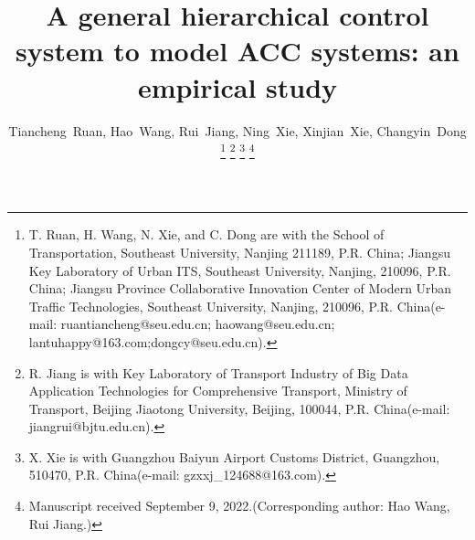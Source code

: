 \documentclass[journal]{IEEEtran}
\begin{document}



\title {A general hierarchical control system to model ACC systems: an empirical study}




%
\author{Tiancheng~Ruan,
  Hao~Wang,
  Rui~Jiang,
  Ning~Xie,
  Xinjian~Xie,
  Changyin~Dong
  \thanks{T. Ruan,  H. Wang, N. Xie, and C. Dong are with the
    School of Transportation, Southeast University, Nanjing 211189, P.R. China;
    Jiangsu Key Laboratory of Urban ITS, Southeast University, Nanjing, 210096, P.R. China;
    Jiangsu Province Collaborative Innovation Center of Modern Urban Traffic Technologies, Southeast University, Nanjing, 210096, P.R. China(e-mail: ruantiancheng@seu.edu.cn;  haowang@seu.edu.cn; lantuhappy@163.com;dongcy@seu.edu.cn).}%
  \thanks{R. Jiang is with Key Laboratory of Transport Industry of Big Data Application Technologies for Comprehensive Transport, Ministry of Transport, Beijing Jiaotong University, Beijing, 100044, P.R. China(e-mail: jiangrui@bjtu.edu.cn).}
  \thanks{X. Xie is with Guangzhou Baiyun Airport Customs District, Guangzhou, 510470, P.R. China(e-mail: gzxxj\_124688@163.com).}
  \thanks{Manuscript received September 9, 2022.(Corresponding author: Hao Wang, Rui Jiang.)}}



\end{document}
